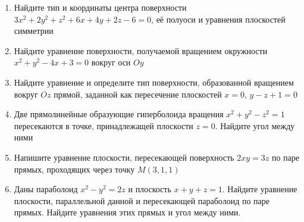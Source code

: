 \begin{enumerate}
    \item Найдите тип и координаты центра поверхности $3x^2 +2y^2 + z^2 + 6x + 4y +2z - 6 = 0$, её полуоси и уравнения плоскостей симметрии
   		
   \item  Найдите уравнение поверхности, получаемой вращением окружности \\ $x^2 + y^2 - 4x + 3 = 0$ вокруг оси $Oy$
	
	\item Найдите уравнение и определите тип поверхности, образованной вращением вокруг $Oz$ прямой, заданной как пересечение плоскостей $x = 0$, $y - z + 1 = 0$ 
	
	\item Две прямолинейные образующие гиперболоида вращения $x^2 + y^2 - z^2 = 1$ пересекаются в точке, принадлежащей плоскости $z = 0$. Найдите угол между ними
	
	\item Напишите уравнение плоскости, пересекающей поверхность $2xy = 3z$ по паре прямых, проходящих через точку $M(3, 1, 1)$
	
	\item Даны параболоид $x^2 - y^2 = 2z$ и плоскость $x + y + z = 1$. Найдите уравнение плоскости, параллельной данной и пересекающей параболоид по паре прямых. Найдите уравнения этих прямых и угол между ними.


   
    
\end{enumerate}